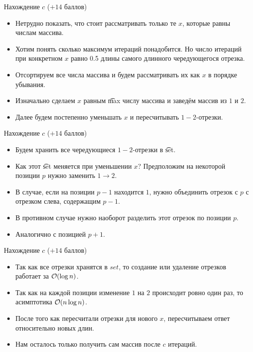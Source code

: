 \begin{frame}{Нахождение $c$ ($+14$ баллов)}
  \begin{itemize}
  \item Нетрудно показать, что стоит рассматривать только те $x$, которые равны числам массива.
  \item Хотим понять сколько максимум итераций понадобится. Но число итераций при конкретном $x$ равно 0.5 длины
    самого длинного чередующегося отрезка.
  \item Отсортируем все числа массива и будем рассматривать их как $x$ в порядке убывания.
  \item Изначально сделаем $x$ равным \t{max} числу массива и заведём массив из $1$ и $2$.
  \item Далее будем постепенно уменьшать $x$ и пересчитывать $1-2$-отрезки.
  \end{itemize}
\end{frame}

\begin{frame}{Нахождение $c$ ($+14$ баллов)}
  \begin{itemize}
  \item Будем хранить все чередующиеся $1-2$-отрезки в \t{set}.
  \item Как этот \t{set} меняется при уменьшении $x$? Предположим на некоторой позиции $p$ нужно заменить $1 \to 2$.
  \item В случае, если на позиции $p - 1$ находится $1$, нужно объединить отрезок с $p$ с отрезком слева, содержащим $p - 1$.
  \item В противном случае нужно наоборот разделить этот отрезок по позиции $p$.
  \item Аналогично с позицией $p + 1$.
  \end{itemize}
\end{frame}

\begin{frame}{Нахождение $c$ ($+14$ баллов)}
  \begin{itemize}
  \item Так как все отрезки хранятся в $set$, то создание или удаление отрезков работает за $\mathcal{O}(\log n)$.
  \item Так как на каждой позиции изменение $1$ на $2$ происходит ровно один раз, то асимптотика $\mathcal{O}(n \log n)$.
  \item После того как пересчитали отрезки для нового $x$, пересчитываем ответ относительно новых длин.
  \item Нам осталось только получить сам массив после $c$ итераций.
  \end{itemize} 
\end{frame}

